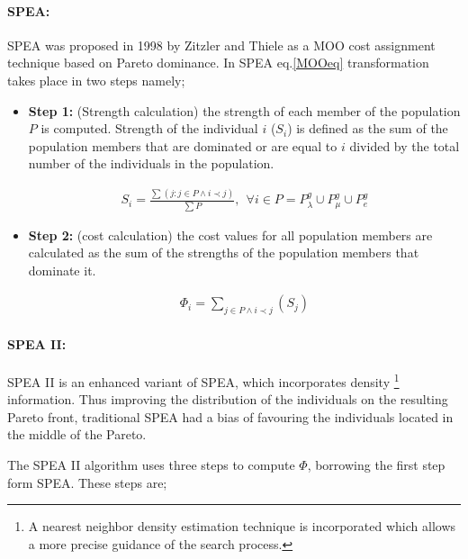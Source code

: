 \paragraph{SPEA:}
SPEA was proposed in 1998 by Zitzler and Thiele \cite{ZiTh98} as a MOO cost assignment technique based on Pareto dominance. In SPEA eq.\ref{MOOeq} transformation takes place in two steps namely;
\begin{itemize}

\item[]{\bf Step 1:}  (Strength calculation) the strength of each member of the population $P$ is computed. Strength of the individual $i$ ($S_i$) is defined as the sum of the population members that are dominated or are equal to $i$ divided by the total number of the individuals in the population.  
 

\begin{eqnarray}
	S_i = \frac{\sum(j : j \in P \wedge i \prec j)} {\sum P}, ~~ \forall i \in P =P_{\lambda}^g \cup P_{\mu}^g \cup P_{e}^g  
\end{eqnarray}

\item[]{\bf Step 2:}  (cost calculation) the cost values for all population members are calculated as the sum of the strengths of the population members that dominate it.

\begin{eqnarray}
	\Phi_i = \sum _{j \in P \wedge i \prec j}(S_j)
\end{eqnarray}
\end{itemize}
  
 
\paragraph{SPEA II:}
SPEA II \cite{Zitz02,Zitz01} is an enhanced variant of SPEA, which incorporates density \footnote{A nearest neighbor density estimation technique is incorporated which allows a more precise guidance of the search process.} information. Thus improving the distribution of the individuals on the resulting Pareto front, traditional SPEA had a bias of favouring the individuals located in the middle of the Pareto. 

The SPEA II algorithm uses three steps to compute $\Phi$, borrowing the first step form SPEA. These steps are;

